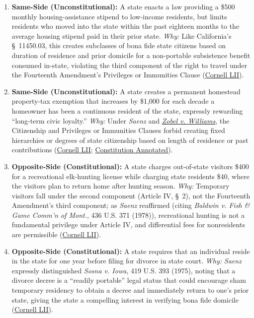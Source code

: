 \documentclass[12pt]{article}
\begin{document}
\begin{enumerate}
\item \textbf{Same-Side (Unconstitutional):} A state enacts a law providing a \$500 monthly housing-assistance stipend to low-income residents, but limits residents who moved into the state within the past eighteen months to the average housing stipend paid in their prior state. \emph{Why:} Like California's \S~11450.03, this creates subclasses of bona fide state citizens based on duration of residence and prior domicile for a non-portable subsistence benefit consumed in-state, violating the third component of the right to travel under the Fourteenth Amendment's Privileges or Immunities Clause (\href{https://www.law.cornell.edu/supremecourt/text/98-97}{Cornell LII}).
\item \textbf{Same-Side (Unconstitutional):} A state creates a permanent homestead property-tax exemption that increases by \$1,000 for each decade a homeowner has been a continuous resident of the state, expressly rewarding ``long-term civic loyalty.'' \emph{Why:} Under \textit{Saenz} and \href{https://supreme.justia.com/cases/federal/us/457/55/}{\textit{Zobel v. Williams}}, the Citizenship and Privileges or Immunities Clauses forbid creating fixed hierarchies or degrees of state citizenship based on length of residence or past contributions (\href{https://www.law.cornell.edu/supremecourt/text/98-97}{Cornell LII}; \href{https://www.law.cornell.edu/constitution-conan/amendment-14/section-1/interstate-travel}{Constitution Annotated}).
\item \textbf{Opposite-Side (Constitutional):} A state charges out-of-state visitors \$400 for a recreational elk-hunting license while charging state residents \$40, where the visitors plan to return home after hunting season. \emph{Why:} Temporary visitors fall under the second component (Article IV, \S~2), not the Fourteenth Amendment's third component; as \textit{Saenz} reaffirmed (citing \textit{Baldwin v. Fish \& Game Comm'n of Mont.}, 436 U.S. 371 (1978)), recreational hunting is not a fundamental privilege under Article IV, and differential fees for nonresidents are permissible (\href{https://www.law.cornell.edu/supremecourt/text/98-97}{Cornell LII}).
\item \textbf{Opposite-Side (Constitutional):} A state requires that an individual reside in the state for one year before filing for divorce in state court. \emph{Why:} \textit{Saenz} expressly distinguished \textit{Sosna v. Iowa}, 419 U.S. 393 (1975), noting that a divorce decree is a ``readily portable'' legal status that could encourage sham temporary residency to obtain a decree and immediately return to one's prior state, giving the state a compelling interest in verifying bona fide domicile (\href{https://www.law.cornell.edu/supremecourt/text/98-97}{Cornell LII}).

\end{enumerate}
\end{document}
